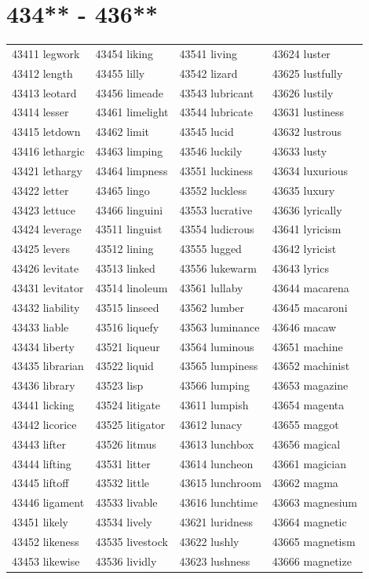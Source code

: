 \documentclass[10pt, oneside]{book}
\begin{document}
\begin{table}
	\centering
	\section*{434** - 436**}
	\begin{tabular}{l l l l}
43411 legwork &43454 liking &43541 living &43624 luster\\
43412 length &43455 lilly &43542 lizard &43625 lustfully\\
43413 leotard &43456 limeade &43543 lubricant &43626 lustily\\
43414 lesser &43461 limelight &43544 lubricate &43631 lustiness\\
43415 letdown &43462 limit &43545 lucid &43632 lustrous\\
43416 lethargic &43463 limping &43546 luckily &43633 lusty\\
43421 lethargy &43464 limpness &43551 luckiness &43634 luxurious\\
43422 letter &43465 lingo &43552 luckless &43635 luxury\\
43423 lettuce &43466 linguini &43553 lucrative &43636 lyrically\\
43424 leverage &43511 linguist &43554 ludicrous &43641 lyricism\\
43425 levers &43512 lining &43555 lugged &43642 lyricist\\
43426 levitate &43513 linked &43556 lukewarm &43643 lyrics\\
43431 levitator &43514 linoleum &43561 lullaby &43644 macarena\\
43432 liability &43515 linseed &43562 lumber &43645 macaroni\\
43433 liable &43516 liquefy &43563 luminance &43646 macaw\\
43434 liberty &43521 liqueur &43564 luminous &43651 machine\\
43435 librarian &43522 liquid &43565 lumpiness &43652 machinist\\
43436 library &43523 lisp &43566 lumping &43653 magazine\\
43441 licking &43524 litigate &43611 lumpish &43654 magenta\\
43442 licorice &43525 litigator &43612 lunacy &43655 maggot\\
43443 lifter &43526 litmus &43613 lunchbox &43656 magical\\
43444 lifting &43531 litter &43614 luncheon &43661 magician\\
43445 liftoff &43532 little &43615 lunchroom &43662 magma\\
43446 ligament &43533 livable &43616 lunchtime &43663 magnesium\\
43451 likely &43534 lively &43621 luridness &43664 magnetic\\
43452 likeness &43535 livestock &43622 lushly &43665 magnetism\\
43453 likewise &43536 lividly &43623 lushness &43666 magnetize\\
	\end{tabular}
 \end{table}
\clearpage
\end{document}
